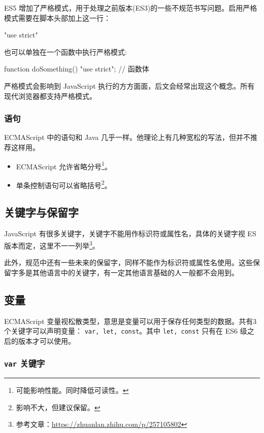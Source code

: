 ES5 增加了严格模式，用于处理之前版本(ES3)的一些不规范书写问题。启用严格模式需要在脚本头部加上这一行：

\begin{JavaScript}
"use strict"
\end{JavaScript}

也可以单独在一个函数中执行严格模式:

\begin{JavaScript}
function doSomething() {
    "use strict";
    // 函数体
}
\end{JavaScript}

严格模式会影响到 JavaScript 执行的方方面面，后文会经常出现这个概念。所有现代浏览器都支持严格模式。

\subsubsection*{语句}

ECMAScript 中的语句和 Java 几乎一样。他理论上有几种宽松的写法，但并不推荐这样用。

\begin{itemize}
    \item ECMAScript 允许省略分号\footnote{可能影响性能。同时降低可读性。}。
    \item 单条控制语句可以省略括号\footnote{影响不大，但建议保留。}。
\end{itemize}

\subsection{关键字与保留字}

JavaScript 有很多关键字，关键字不能用作标识符或属性名，具体的关键字视 ES 版本而定，这里不一一列举\footnote{参考文章：\url{https://zhuanlan.zhihu.com/p/257105802}}。

此外，规范中还有一些未来的保留字，同样不能作为标识符或属性名使用。这些保留字多是其他语言中的关键字，有一定其他语言基础的人一般都不会用到。

\subsection{变量}

ECMAScript 变量视松散类型，意思是变量可以用于保存任何类型的数据。共有3个关键字可以声明变量： \texttt{var, let, const}。其中 \texttt{let, const} 只有在 ES6 级之后的版本才可以使用。

\subsubsection{\texttt{var} 关键字}

